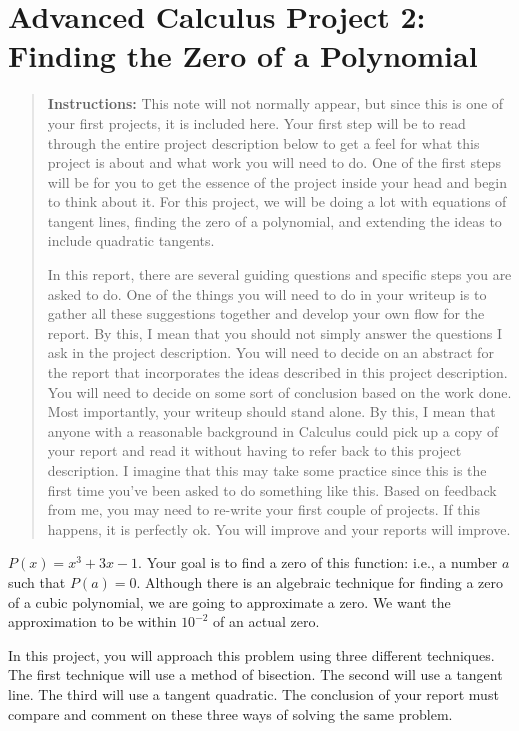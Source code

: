 \documentclass
[justified,nohyper]
{tufte-handout}
\theoremstyle{mydef}
\begin{document}
\section{Advanced Calculus Project 2: Finding the Zero of a Polynomial}

\begin{quote}
\textbf{Instructions:} This note will not normally appear, but since this is one of your first projects, it is included here. Your first step will be to read through the entire project description below to get a feel for what this project is about and what work you will need to do. One of the first steps will be for you to get the essence of the project inside your head and begin to think about it. For this project, we will be doing a lot with equations of tangent lines, finding the zero of a polynomial, and extending the ideas to include quadratic tangents.

In this report, there are several guiding questions and specific steps you are asked to do. One of the things you will need to do in your writeup is to gather all these suggestions together and develop your own flow for the report. By this, I mean that you should not simply answer the questions I ask in the project description. You will need to decide on an abstract for the report that incorporates the ideas described in this project description. You will need to decide on some sort of conclusion based on the work done. Most importantly, your writeup should stand alone. By this, I mean that anyone with a reasonable background in Calculus could pick up a copy of your report and read it without having to refer back to this project description. I imagine that this may take some practice since this is the first time you've been asked to do something like this. Based on feedback from me, you may need to re-write your first couple of projects. If this happens, it is perfectly ok. You will improve and your reports will improve.
\end{quote}

 $P(x)=x^3+3x-1$. Your goal is to find a zero of this function: i.e., a number $a$ such that $P(a)=0$. Although there is an algebraic technique for finding a zero of a cubic polynomial, we are going to approximate a zero. We want the approximation to be within $10^{-2}$ of an actual zero.

In this project, you will approach this problem using three different techniques. The first technique will use a method of bisection. The second will use a tangent line. The third will use a tangent quadratic. The conclusion of your report must compare and comment on these three ways of solving the same problem.
\end{document}
